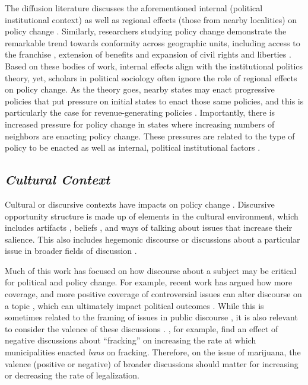 The diffusion literature discusses the aforementioned internal (political institutional context) as well as regional effects (those from nearby localities) on policy change \citep{bradford_and_bradford_2017,berry_and_berry_1990,glick_and_friedland_2014}. Similarly, researchers studying policy change demonstrate the remarkable trend towards conformity across geographic units, including access to the franchise \citep{uggen_and_manza_2002,manza_and_brooks_1999}, extension of benefits \citep{amenta_2006,amenta_et_al_2005} and expansion of civil rights and liberties \citep{andrews_1997}. Based on these bodies of work, internal effects align with the institutional politics theory, yet, scholars in political sociology often ignore the role of regional effects on policy change. As the theory goes, nearby states may enact progressive policies that put pressure on initial states to enact those same policies, and this is particularly the case for revenue-generating policies \citep{bradford_and_bradford_2017,berry_and_berry_1990}. Importantly, there is increased pressure for policy change in states where increasing numbers of neighbors are enacting policy change.  These pressures are related to the type of policy to be enacted as well as internal, political institutional factors \citep{boushey_2016,berry_and_berry_1990}. 

\subsection{\it{Cultural Context}}


Cultural or discursive contexts have impacts on policy change \citep{vasi_et_al_2015}. Discursive opportunity structure \citep{mccammon_et_al_2007,ghaziani_and_baldassarri_2011} is made up of elements in the cultural environment, which includes artifacts \citep{vasi_et_al_2015}, beliefs \citep{mccammon_et_al_2007}, and ways of talking about issues \citep{bail_2012,bail_et_al_2017} that increase their salience. This also includes hegemonic discourse or discussions about a particular issue in broader fields of discussion \citep{bail_2012,mccammon_et_al_2007}. 


Much of this work has focused on how discourse about a subject may be critical for political and policy change. For example, recent work has argued how more coverage, and more positive coverage of controversial issues \citep{amenta_et_al_2019,amenta_et_al_2009} can alter discourse on a topic \citep{bail_2012,ghaziani_and_baldassarri_2011}, which can ultimately impact political outcomes \citep{vasi_et_al_2015}. While this is sometimes related to the framing of issues in public discourse \citep{benford_and_snow_2000,snow_et_al_2007}, it is also relevant to consider the valence of these discussions \citep{vasi_et_al_2015,seguin_2016}. \citet{vasi_et_al_2015}, for example, find an effect of negative discussions about ``fracking'' on increasing the rate at which municipalities enacted \textit{bans} on fracking. Therefore, on the issue of marijuana, the valence (positive or negative) of broader discussions should matter for increasing or decreasing the rate of legalization. 








